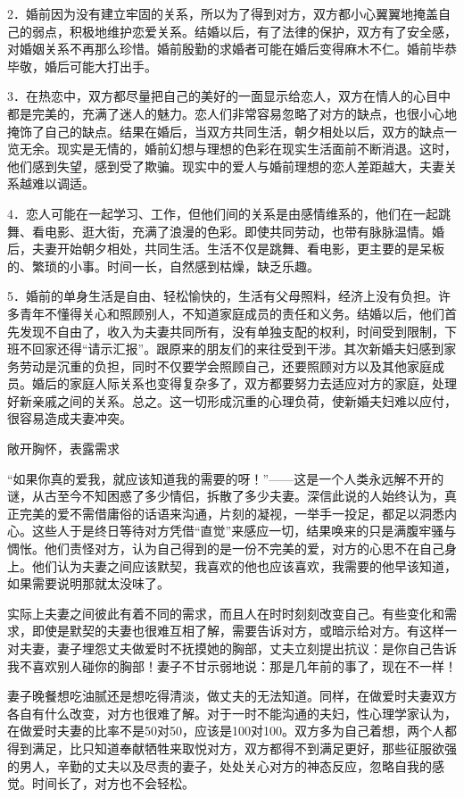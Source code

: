 \documentclass[12pt,UTF8]{ctexbook}
\begin{document}
2．婚前因为没有建立牢固的关系，所以为了得到对方，双方都小心翼翼地掩盖自己的弱点，积极地维护恋爱关系。结婚以后，有了法律的保护，双方有了安全感，对婚姻关系不再那么珍惜。婚前殷勤的求婚者可能在婚后变得麻木不仁。婚前毕恭毕敬，婚后可能大打出手。

3．在热恋中，双方都尽量把自己的美好的一面显示给恋人，双方在情人的心目中都是完美的，充满了迷人的魅力。恋人们非常容易忽略了对方的缺点，也很小心地掩饰了自己的缺点。结果在婚后，当双方共同生活，朝夕相处以后，双方的缺点一览无余。现实是无情的，婚前幻想与理想的色彩在现实生活面前不断消退。这时，他们感到失望，感到受了欺骗。现实中的爱人与婚前理想的恋人差距越大，夫妻关系越难以调适。

4．恋人可能在一起学习、工作，但他们间的关系是由感情维系的，他们在一起跳舞、看电影、逛大街，充满了浪漫的色彩。即使共同劳动，也带有脉脉温情。婚后，夫妻开始朝夕相处，共同生活。生活不仅是跳舞、看电影，更主要的是呆板的、繁琐的小事。时间一长，自然感到枯燥，缺乏乐趣。

5．婚前的单身生活是自由、轻松愉快的，生活有父母照料，经济上没有负担。许多青年不懂得关心和照顾别人，不知道家庭成员的责任和义务。结婚以后，他们首先发现不自由了，收入为夫妻共同所有，没有单独支配的权利，时间受到限制，下班不回家还得“请示汇报”。跟原来的朋友们的来往受到干涉。其次新婚夫妇感到家务劳动是沉重的负担，同时不仅要学会照顾自己，还要照顾对方以及其他家庭成员。婚后的家庭人际关系也变得复杂多了，双方都要努力去适应对方的家庭，处理好新亲戚之间的关系。总之。这一切形成沉重的心理负荷，使新婚夫妇难以应付，很容易造成夫妻冲突。





敞开胸怀，表露需求


“如果你真的爱我，就应该知道我的需要的呀！”——这是一个人类永远解不开的谜，从古至今不知困惑了多少情侣，拆散了多少夫妻。深信此说的人始终认为，真正完美的爱不需借庸俗的话语来沟通，片刻的凝视，一举手一投足，都足以洞悉内心。这些人于是终日等待对方凭借“直觉”来感应一切，结果唤来的只是满腹牢骚与惆怅。他们责怪对方，认为自己得到的是一份不完美的爱，对方的心思不在自己身上。他们认为夫妻之间应该默契，我喜欢的他也应该喜欢，我需要的他早该知道，如果需要说明那就太没味了。

实际上夫妻之间彼此有着不同的需求，而且人在时时刻刻改变自己。有些变化和需求，即使是默契的夫妻也很难互相了解，需要告诉对方，或暗示给对方。有这样一对夫妻，妻子埋怨丈夫做爱时不抚摸她的胸部，丈夫立刻提出抗议：是你自己告诉我不喜欢别人碰你的胸部！妻子不甘示弱地说：那是几年前的事了，现在不一样！

妻子晚餐想吃油腻还是想吃得清淡，做丈夫的无法知道。同样，在做爱时夫妻双方各自有什么改变，对方也很难了解。对于一时不能沟通的夫妇，性心理学家认为，在做爱时夫妻的比率不是50对50，应该是100对100。双方多为自己着想，两个人都得到满足，比只知道奉献牺牲来取悦对方，双方都得不到满足更好，那些征服欲强的男人，辛勤的丈夫以及尽责的妻子，处处关心对方的神态反应，忽略自我的感觉。时间长了，对方也不会轻松。
\end{document}
